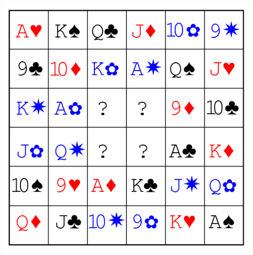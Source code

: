\documentclass{beamer}
\begin{document}
\begin{frame}
\begin{center}\includegraphics{36_oficerow.png}\end{center}
  
  \end{frame}
\end{document}
